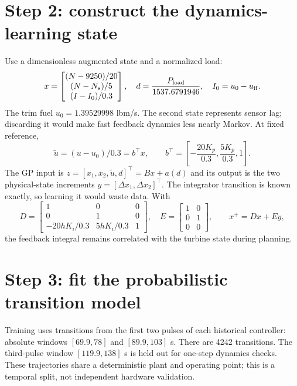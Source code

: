 \documentclass[11pt,a4paper]{article}
\begin{document}
\section{Step 2: construct the dynamics-learning state}
Use a dimensionless augmented state and a normalized load:
\begin{equation}
 x=\begin{bmatrix}(N-9250)/20\\(N-N_s)/5\\(I-I_0)/0.3\end{bmatrix},\quad
 d=\frac{P_{\rm load}}{1537.6791946},\quad I_0=u_0-u_{\rm ff}.
\end{equation}
The trim fuel $u_0=1.39529998$ lbm/s. The second state represents sensor lag; discarding it would make fast feedback dynamics less nearly Markov. At fixed reference,
\begin{equation}
 \tilde u=(u-u_0)/0.3=b^\top x,\qquad
 b^\top=\left[-\frac{20K_p}{0.3},\frac{5K_p}{0.3},1\right].
\end{equation}
The GP input is $z=[x_1,x_2,\tilde u,d]^\top=B x+a(d)$ and its output is the two physical-state increments $y=[\Delta x_1,\Delta x_2]^\top$. The integrator transition is known exactly, so learning it would waste data. With
\begin{equation}
 D=\begin{bmatrix}1&0&0\\0&1&0\\-20hK_i/0.3&5hK_i/0.3&1\end{bmatrix},\quad
 E=\begin{bmatrix}1&0\\0&1\\0&0\end{bmatrix},\qquad x^+=Dx+Ey,
\end{equation}
the feedback integral remains correlated with the turbine state during planning.

\section{Step 3: fit the probabilistic transition model}
Training uses transitions from the first two pulses of each historical controller: absolute windows $[69.9,78]$ and $[89.9,103]$ s. There are 4242 transitions. The third-pulse window $[119.9,138]$ s is held out for one-step dynamics checks. These trajectories share a deterministic plant and operating point; this is a temporal split, not independent hardware validation.
\end{document}
